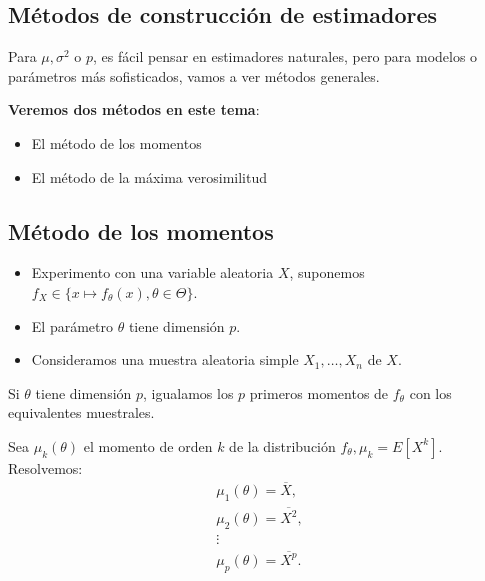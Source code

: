 \subsection{Métodos de construcción de estimadores}
Para $\mu,\sigma^2$ o $p$, es fácil pensar en estimadores naturales, pero para modelos o parámetros más sofisticados, vamos a ver métodos generales.

\textbf{Veremos dos métodos en este tema}:
\begin{itemize}[label=\textbullet]
    \item El método de los momentos
    \item El método de la máxima verosimilitud
\end{itemize}
\subsection{Método de los momentos}
\begin{tcolorbox}[colback=blue!5!white, colframe=blue!75!black, title=\textbf{Contexto}]
\begin{itemize}[label=\textbullet]
    \item Experimento con una variable aleatoria $X$, suponemos $f_X \in \{x\longmapsto f_\theta(x),\theta \in \Theta \} $.
    \item El parámetro $\theta$ tiene dimensión $p$.
    \item Consideramos una muestra aleatoria simple  $X_1,\dots,X_n$ de $X$.
\end{itemize}
\end{tcolorbox}
Si $\theta$ tiene dimensión $p$, igualamos los $p$ primeros momentos de $f_\theta$ con los equivalentes muestrales.

Sea $\mu_k(\theta)$ el momento de orden $k$ de la distribución $f_\theta, \mu_k=E[X^k]$. Resolvemos: \[
\begin{array}{r}
    \mu_1(\theta)=\overline{X},\\
    \mu_2(\theta)=\overline{X^2},\\
    \vdots\\
    \mu_p(\theta)=\overline{X^p}.
\end{array}
\] 
